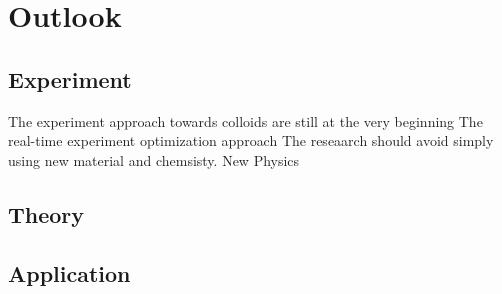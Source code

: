 \chapter{Outlook}
\section{Experiment}
The experiment approach towards colloids are still at the very beginning 
The real-time experiment optimization approach
The reseaarch should avoid simply using new material and chemsisty.
New Physics 
\section{Theory}
\section{Application}